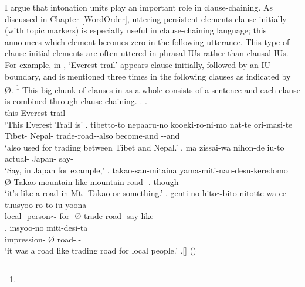 I argue that intonation units play an important role in clause-chaining.
As discussed in Chapter \ref{WordOrder},
uttering persistent elements clause-initially (with topic markers) is especially useful in clause-chaining language;
this announces which element becomes zero in the following utterance.
This type of clause-initial elements are often uttered in phrasal IUs rather than clausal IUs.
For example, in \Next,
 `Everest trail' appears clause-initially,
followed by an IU boundary,
and is mentioned three times in the following clauses as indicated by {\O}.%
 \footnote{
 }
This big chunk of clauses in \Next as a whole consists of a sentence and
each clause is combined through clause-chaining.
%
\ex.
\ag.   {\tp{\dvline}} \\
	this Everest-trail-- {} \\
	`{This Everest Trail} is'
\bg. tibetto-to nepaaru-no \tp{\dvline} kooeki-ro-ni-mo nat-te ori-masi-te\tp{\dvline} \\
	Tibet- Nepal- {} trade-road--also become-and --and \\
	`also used for trading  between Tibet and Nepal.'
\cg. ma zissai-wa nihon-de iu-to \tp{\dvline} \\
	 actual- Japan- say- {} \\
	`Say, in Japan for example,'
\dg. \EM{\O} takao-san-mitaina \tp{\dvline} yama-miti-nan-desu-keredomo \tp{\dvline} \\
	{\O} Takao-mountain-like {} mountain-road--.-though {} \\
	`it's like a road in Mt.\ Takao or something.'
\eg. genti-no hito$\sim$bito-nitotte-wa \tp{\dvline} ee \tp{\dvline} \EM{\O} tuusyoo-ro-to \tp{\dvline} iu-yoona \\
	local- person$\sim$-for- {}  {} {\O} trade-road- {} say-like \\
\bg. insyoo-no \EM{\O} miti-desi-ta \tp{\dvline} \\
	 impression- {\O} road-.- {} \\
 `{it} was a road like trading road for local people.'
 \b.[] \hfill{()}

